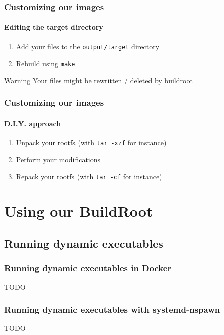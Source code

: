 \documentclass{beamer}
\begin{document}
\begin{frame}
  \frametitle{Customizing our images}
  \framesubtitle{Editing the target directory}
  \begin{enumerate}
    \item Add your files to the \texttt{output/target} directory
    \item Rebuild using \texttt{make}
  \end{enumerate}
  \begin{alertblock}{Warning}
    Your files might be rewritten / deleted by buildroot
  \end{alertblock}
\end{frame}
\begin{frame}
  \frametitle{Customizing our images}
  \framesubtitle{D.I.Y. approach}
  \begin{enumerate}
    \item Unpack your rootfs (with \texttt{tar -xzf} for instance)
    \item Perform your modifications
    \item Repack your rootfs (with \texttt{tar -cf} for instance)
  \end{enumerate}
\end{frame}
\section{Using our BuildRoot}
\subsection{Running dynamic executables}
\begin{frame}
  \frametitle{Running dynamic executables in Docker}
  \begin{center}
    TODO
  \end{center}
\end{frame}
\begin{frame}
  \frametitle{Running dynamic executables with systemd-nspawn}
  \begin{center}
    TODO
  \end{center}
\end{frame}
\end{document}
